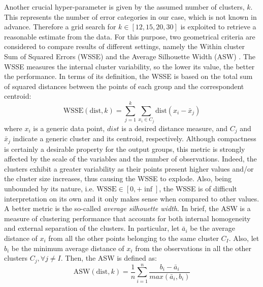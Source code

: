 Another crucial hyper-parameter is given by the assumed number of clusters, $k$. This represents the number of error categories in our case, which is not known in advance. 
Therefore a grid search for $k \in [12, 15, 20, 30] $ is exploited to retrieve a reasonable estimate from the data.
For this purpose, two geometrical criteria are considered to compare results of different settings, namely the Within cluster Sum of Squared Errors (WSSE) and the Average Silhouette Width (ASW) \cite{rousseeuw1987ASW}.
The WSSE measures the internal cluster variability, so the lower its value, the better the performance.
In terms of its definition, the WSSE is based on the total sum of squared distances between the points of each group and the correspondent centroid:
\begin{equation}
    \text{WSSE}\left(\text{dist}, k\right) = 
    \sum_{j=1}^{k}{ 
    \sum_{x_i \in C_j}{\text{dist}\left( x_i - \bar{x}_j\right)} 
    }
\end{equation}
where $x_i$ is a generic data point, ${dist}$ is a desired distance measure, and $C_j$ and $\bar{x}_j$ indicate a generic cluster and its centroid, respectively.
Although compactness is certainly a desirable property for the output groups, this metric is strongly affected by the scale of the variables and the number of observations. Indeed, the clusters exhibit a greater variability as their points present higher values and/or the cluster size increases, thus causing the WSSE to explode. 
Also, being unbounded by its nature, i.e. $\text{WSSE} \in \left[ 0, +\inf \right]$, the WSSE is of difficult interpretation on its own and it only makes sense when compared to other values. \\
A better metric is the so-called \textit{average silhouette width}. In brief, the ASW is a measure of clustering performance that accounts for both internal homogeneity and external separation of the clusters.
In particular, let $\bar{a}_i$ be the average distance of $x_i$ from all the other points belonging to the same cluster $C_I$. Also, let $b_i$ be the minimum average distance of $x_i$ from the observations in all the other clusters $C_j , \forall j \neq I$. Then, the ASW is defined as:
\begin{equation}
    \text{ASW}\left(\text{dist}, k\right) = 
    \dfrac{1}{n} \sum_{i=1}^{n}{ 
    \dfrac{b_i - \bar{a}_i}{ max\left( \bar{a}_i, b_i \right) }
    }
\end{equation}
